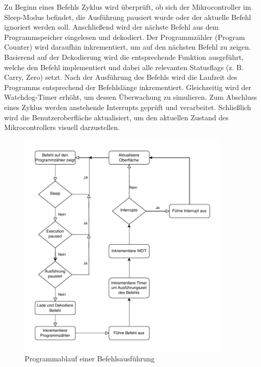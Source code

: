 Zu Beginn eines Befehls Zyklus wird überprüft, ob sich der Mikrocontroller im Sleep-Modus befindet, die Ausführung pausiert wurde oder der aktuelle Befehl ignoriert werden soll. Anschließend wird der nächste Befehl aus dem Programmspeicher eingelesen und dekodiert. Der Programmzähler (Program Counter) wird daraufhin inkrementiert, um auf den nächsten Befehl zu zeigen. Basierend auf der Dekodierung wird die entsprechende Funktion ausgeführt, welche den Befehl implementiert und dabei alle relevanten Statusflags (z. B. Carry, Zero) setzt. Nach der Ausführung des Befehls wird die Laufzeit des Programms entsprechend der Befehlslänge inkrementiert. Gleichzeitig wird der Watchdog-Timer erhöht, um dessen Überwachung zu simulieren. Zum Abschluss eines Zyklus werden anstehende Interrupts geprüft und verarbeitet. Schließlich wird die Benutzeroberfläche aktualisiert, um den aktuellen Zustand des Mikrocontrollers visuell darzustellen.

\begin{figure}[H]
    \centering
    \includegraphics[width=0.9\textwidth]{./img/excec_cycle.drawio.pdf}
    \caption{Programmablauf einer Befehlsausführung}
    \label{fig:execTask}
\end{figure}


